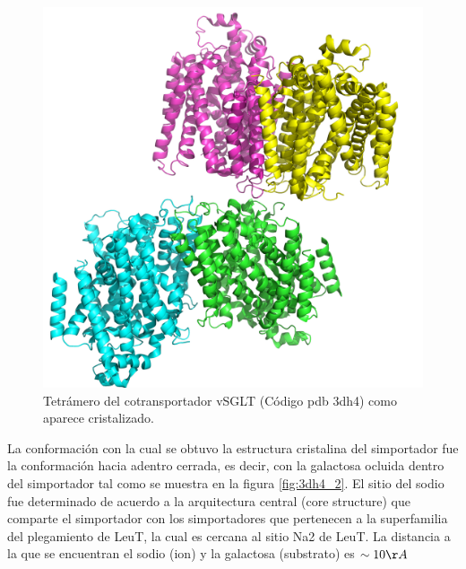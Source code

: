 \begin{figure}[H]
\centering
\includegraphics[scale=0.1]{Kap3/3dh4tetra.png}
\caption{Tetr\'{a}mero del cotransportador vSGLT (C\'{o}digo pdb 3dh4) como aparece cristalizado.}\label{fig:3dh4}
\end{figure}
La conformaci\'{o}n con la cual se obtuvo la estructura cristalina del simportador fue la conformaci\'{o}n hacia adentro cerrada, es decir, con la galactosa ocluida dentro del simportador tal como se muestra en la figura \ref{fig:3dh4_2}. El sitio del sodio fue determinado de acuerdo a la arquitectura central (core structure) que comparte el simportador con los simportadores que pertenecen a la superfamilia del plegamiento de LeuT, la cual es cercana al sitio Na2 de LeuT. La distancia a la que se encuentran el sodio (ion) y la galactosa (substrato) es $\sim 10 \AA$\\
